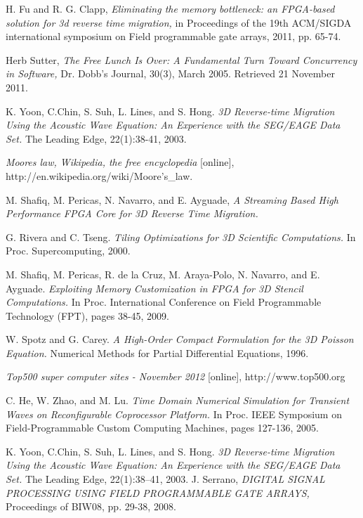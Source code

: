 \begin{thebibliography}{9}
   H. Fu and R. G. Clapp, \emph{Eliminating the memory
    bottleneck: an FPGA-based solution for 3d reverse time migration,}
    in Proceedings of the 19th ACM/SIGDA international symposium on Field
    programmable gate arrays, 2011, pp. 65-74.

   Herb Sutter, \emph{The Free Lunch Is Over: A Fundamental
    Turn Toward Concurrency in Software,} Dr. Dobb's Journal, 30(3), March
    2005. Retrieved 21 November 2011.

   K. Yoon, C.Chin, S. Suh, L. Lines, and S. Hong.
    \emph{3D Reverse-time Migration Using the Acoustic Wave Equation:
    An Experience with the SEG/EAGE Data Set.} The Leading Edge, 22(1):38-41,
    2003.

    \emph{Moores law, Wikipedia, the free encyclopedia} [online],
    http://en.wikipedia.org/wiki/Moore's\_law.

   M. Shafiq, M. Pericas, N. Navarro, and E. Ayguade,
    \emph{A Streaming Based High Performance FPGA Core for 3D Reverse
    Time Migration.}

   G. Rivera and C. Tseng.
    \emph{Tiling Optimizations for 3D Scientific Computations.}
    In Proc. Supercomputing, 2000.

   M. Shafiq, M. Pericas, R. de la Cruz, M. Araya-Polo,
    N. Navarro, and E. Ayguade.
    \emph{Exploiting Memory
    Customization in FPGA for 3D Stencil Computations.}
    In Proc. International Conference on Field
    Programmable Technology (FPT), pages 38-45, 2009.

   W. Spotz and G. Carey.
    \emph{A High-Order Compact Formulation for the 3D Poisson Equation.}
    Numerical Methods for Partial Differential Equations, 1996.

    \emph{Top500 super computer sites - November 2012} [online],
    http://www.top500.org

   C. He, W. Zhao, and M. Lu.
    \emph{Time Domain Numerical
      Simulation for Transient Waves on Reconfigurable
    Coprocessor Platform.}
    In Proc. IEEE Symposium on Field-Programmable Custom Computing Machines,
    pages 127-136, 2005.

  K. Yoon, C.Chin, S. Suh, L. Lines, and S. Hong.
    \emph{3D Reverse-time Migration Using the Acoustic Wave
      Equation: An Experience with the SEG/EAGE Data
    Set. }
    The Leading Edge, 22(1):38–41, 2003.
    J. Serrano,
    \emph{DIGITAL SIGNAL PROCESSING USING FIELD PROGRAMMABLE GATE ARRAYS,}
    Proceedings of BIW08, pp. 29-38, 2008.


\end{thebibliography}
